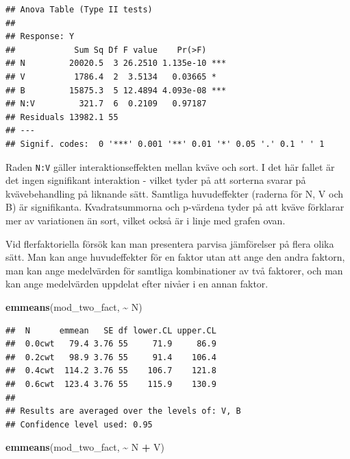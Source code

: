 \documentclass[
]{book}
\newenvironment{Shaded}{\begin{snugshade}}{\end{snugshade}}
\newcommand{\FunctionTok}[1]{\textcolor[rgb]{0.13,0.29,0.53}{\textbf{#1}}}
\newcommand{\NormalTok}[1]{#1}
\newcommand{\SpecialCharTok}[1]{\textcolor[rgb]{0.81,0.36,0.00}{\textbf{#1}}}
\theoremstyle{definition}
\theoremstyle{definition}
\theoremstyle{definition}
\theoremstyle{definition}
\theoremstyle{remark}
\begin{document}
\begin{verbatim}
## Anova Table (Type II tests)
## 
## Response: Y
##            Sum Sq Df F value    Pr(>F)    
## N         20020.5  3 26.2510 1.135e-10 ***
## V          1786.4  2  3.5134   0.03665 *  
## B         15875.3  5 12.4894 4.093e-08 ***
## N:V         321.7  6  0.2109   0.97187    
## Residuals 13982.1 55                      
## ---
## Signif. codes:  0 '***' 0.001 '**' 0.01 '*' 0.05 '.' 0.1 ' ' 1
\end{verbatim}

Raden \texttt{N:V} gäller interaktionseffekten mellan kväve och sort. I det här fallet är det ingen signifikant interaktion - vilket tyder på att sorterna svarar på kvävebehandling på liknande sätt. Samtliga huvudeffekter (raderna för N, V och B) är signifikanta. Kvadratsummorna och p-värdena tyder på att kväve förklarar mer av variationen än sort, vilket också är i linje med grafen ovan.

Vid flerfaktoriella försök kan man presentera parvisa jämförelser på flera olika sätt. Man kan ange huvudeffekter för en faktor utan att ange den andra faktorn, man kan ange medelvärden för samtliga kombinationer av två faktorer, och man kan ange medelvärden uppdelat efter nivåer i en annan faktor.

\begin{Shaded}
\begin{Highlighting}[]
\FunctionTok{emmeans}\NormalTok{(mod\_two\_fact, }\SpecialCharTok{\textasciitilde{}}\NormalTok{ N)}
\end{Highlighting}
\end{Shaded}

\begin{verbatim}
##  N      emmean   SE df lower.CL upper.CL
##  0.0cwt   79.4 3.76 55     71.9     86.9
##  0.2cwt   98.9 3.76 55     91.4    106.4
##  0.4cwt  114.2 3.76 55    106.7    121.8
##  0.6cwt  123.4 3.76 55    115.9    130.9
## 
## Results are averaged over the levels of: V, B 
## Confidence level used: 0.95
\end{verbatim}

\begin{Shaded}
\begin{Highlighting}[]
\FunctionTok{emmeans}\NormalTok{(mod\_two\_fact, }\SpecialCharTok{\textasciitilde{}}\NormalTok{ N }\SpecialCharTok{+}\NormalTok{ V)}
\end{Highlighting}
\end{Shaded}
\end{document}
